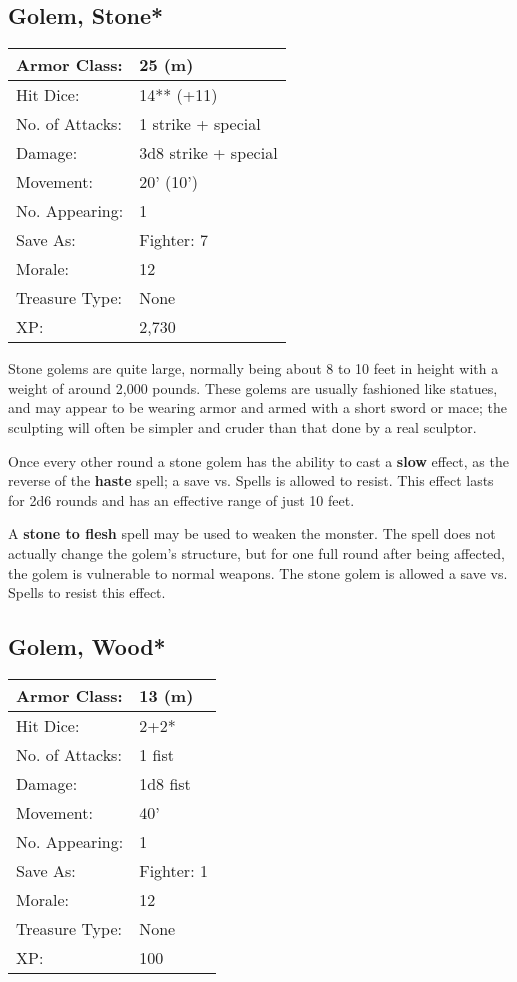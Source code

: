 \documentclass[a4paper,twoside,openany,10pt]{book}
\begin{document}
\begin{multicols}{2}
\subsection*{Golem, Stone*}\label{golem-stone}

\begin{tabularx}{0.48\textwidth}{@{}lX@{}}
Armor Class: & 25 (m) \\\hline
Hit Dice: & 14** (+11)  \\\hline
No. of Attacks: & 1 strike + special \\\hline
Damage: & 3d8 strike + special \\\hline
Movement: & 20' (10') \\\hline
No. Appearing: & 1 \\\hline
Save As: & Fighter: 7 \\\hline
Morale: & 12 \\\hline
Treasure Type: & None \\\hline
XP: & 2,730 \\\hline
\end{tabularx}\medskip

Stone golems are quite large, normally being about 8 to 10 feet in height with a weight of around 2,000 pounds. These golems are usually fashioned like statues, and may appear to be wearing armor and armed with a short sword or mace; the sculpting will often be simpler and cruder than that done by a real sculptor.

Once every other round a stone golem has the ability to cast a \textbf{slow} effect, as the reverse of the \textbf{haste} spell; a save vs. Spells is allowed to resist. This effect lasts for 2d6 rounds and has an effective range of just 10 feet.

A \textbf{stone to flesh }spell may be used to weaken the monster. The spell does not actually change the golem's structure, but for one full round after being affected, the golem is vulnerable to normal weapons. The stone golem is allowed a save vs. Spells to resist this effect.

\subsection*{Golem, Wood*}\label{golem-wood}

\begin{tabularx}{0.48\textwidth}{@{}lX@{}}
Armor Class: & 13 (m) \\\hline
Hit Dice: & 2+2* \\\hline
No. of Attacks: & 1 fist \\\hline
Damage: & 1d8 fist \\\hline
Movement: & 40' \\\hline
No. Appearing: & 1 \\\hline
Save As: & Fighter: 1 \\\hline
Morale: & 12 \\\hline
Treasure Type: & None \\\hline
XP: & 100 \\\hline
\end{tabularx}\medskip


\end{multicols}
\end{document}

